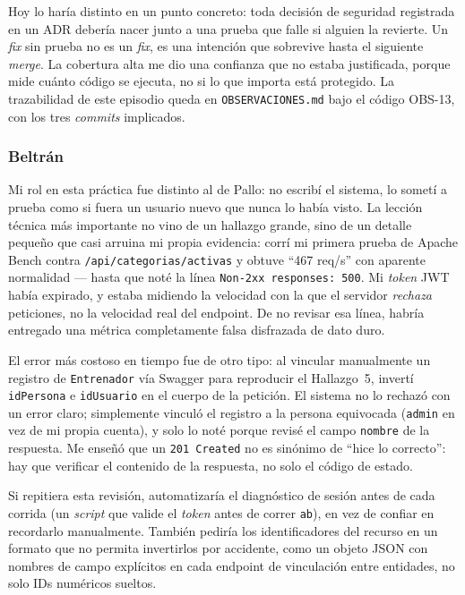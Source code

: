 \documentclass[12pt,a4paper]{article}
\begin{document}
Hoy lo haría distinto en un punto concreto: toda decisión de seguridad registrada en un ADR
debería nacer junto a una prueba que falle si alguien la revierte. Un \textit{fix} sin prueba no
es un \textit{fix}, es una intención que sobrevive hasta el siguiente \textit{merge}. La cobertura
alta me dio una confianza que no estaba justificada, porque mide cuánto código se ejecuta, no si
lo que importa está protegido. La trazabilidad de este episodio queda en \texttt{OBSERVACIONES.md}
bajo el código OBS-13, con los tres \textit{commits} implicados.

\subsubsection*{Beltrán}

Mi rol en esta práctica fue distinto al de Pallo: no escribí el sistema, lo sometí a prueba
como si fuera un usuario nuevo que nunca lo había visto. La lección técnica más importante no
vino de un hallazgo grande, sino de un detalle pequeño que casi arruina mi propia evidencia:
corrí mi primera prueba de Apache Bench contra \texttt{/api/categorias/activas} y obtuve
``467 req/s'' con aparente normalidad --- hasta que noté la línea \texttt{Non-2xx responses:
500}. Mi \textit{token} JWT había expirado, y estaba midiendo la velocidad con la que el
servidor \emph{rechaza} peticiones, no la velocidad real del endpoint. De no revisar esa
línea, habría entregado una métrica completamente falsa disfrazada de dato duro.

El error más costoso en tiempo fue de otro tipo: al vincular manualmente un registro de
\texttt{Entrenador} vía Swagger para reproducir el Hallazgo~5, invertí \texttt{idPersona} e
\texttt{idUsuario} en el cuerpo de la petición. El sistema no lo rechazó con un error claro;
simplemente vinculó el registro a la persona equivocada (\texttt{admin} en vez de mi propia
cuenta), y solo lo noté porque revisé el campo \texttt{nombre} de la respuesta. Me enseñó que
un \texttt{201 Created} no es sinónimo de ``hice lo correcto'': hay que verificar el contenido
de la respuesta, no solo el código de estado.

Si repitiera esta revisión, automatizaría el diagnóstico de sesión antes de cada corrida
(un \textit{script} que valide el \textit{token} antes de correr \texttt{ab}), en vez de
confiar en recordarlo manualmente. También pediría los identificadores del recurso en un
formato que no permita invertirlos por accidente, como un objeto JSON con nombres de campo
explícitos en cada endpoint de vinculación entre entidades, no solo IDs numéricos sueltos.
\end{document}

